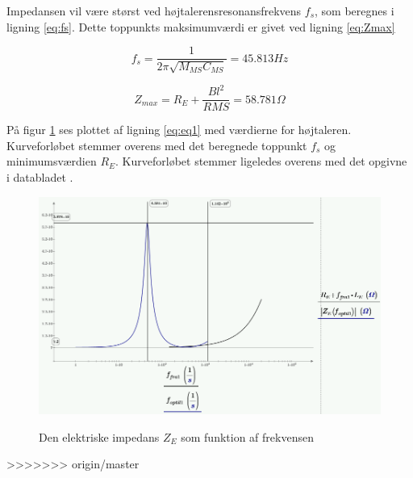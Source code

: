 Impedansen vil være størst ved højtalerensresonansfrekvens $f_s$, som beregnes i ligning \ref{eq:fs}. Dette toppunkts maksimumværdi er givet ved ligning \ref{eq:Zmax} 

\begin{equation}\label{eq:fs}
	f_s=\frac{1}{2 \pi \sqrt{M_{MS} C_{MS}}}=45.813Hz
\end{equation}

\begin{equation}\label{eq:Zmax}
	Z_{max}=R_E+\frac{Bl^2}{R{MS}}=58.781\Omega
\end{equation}

På figur \ref{fig:ZE_graf}  ses plottet af ligning \ref{eq:eq1} med værdierne for højtaleren. Kurveforløbet stemmer overens med det beregnede toppunkt $f_s$ og minimumsværdien $R_E$. Kurveforløbet stemmer ligeledes overens med det opgivne i databladet \citep{FW168}.

\begin{figure}[H]
	\centering
	\includegraphics[width=\textwidth]{Pics/ZE_graf.PNG}
	\label{fig:ZE_graf}
	\caption{Den elektriske impedans $Z_E$ som funktion af frekvensen} 
\end{figure}
>>>>>>> origin/master
